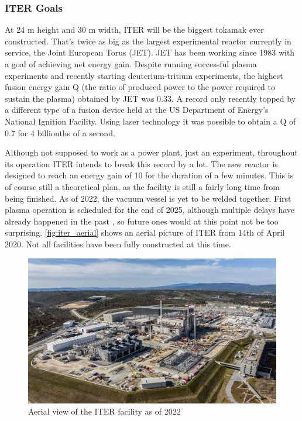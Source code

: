   \subsubsection{ITER Goals}

	At 24 m height and 30 m width, 
	ITER will be the biggest tokamak ever constructed. 
	That's twice as big as the largest experimental reactor currently in service, 
	the Joint European Torus (JET). JET has been working since 1983 with 
	a goal of achieving net energy gain. Despite running successful 
	plasma experiments and recently starting deuterium-tritium experiments,
	the highest fusion energy gain Q 
	(the ratio of produced power to the power required to sustain the plasma)
	obtained by JET was 0.33. A record only recently topped by a different 
	type of a fusion device held at the US Department of Energy’s
	National Ignition Facility. Using laser technology it was possible to
	obtain a Q of 0.7 for 4 billionths of a second. \cite{fusion_records}
	

	Although not supposed to work as a power plant, just an experiment,
	throughout its operation ITER intends to break this record by a lot.
	The new reactor is designed to reach an energy gain of 10 
	for the duration of a few minutes. This is of course still a theoretical
	plan, as the facility is still a fairly long time from being finished.
	As of 2022, the vacuum vessel is yet to be welded together\cite{iter_timeline}.
	First plasma operation is scheduled for the end of 2025\cite{iter_timeline},
	although multiple delays have already happened in the past \cite{iter_delays},
	so future ones would at this point not be too surprising. 
  \autoref{fig:iter_aerial} shows an aerial picture of ITER from 14th of April 2020.
  Not all facilities have been fully constructed at this time.
	\begin{figure}[H]
	  \centering
	  \includegraphics[width=.9\linewidth]{media/iter_aerial_2022.jpg}
	  \caption{Aerial view of the ITER facility as of 2022\cite{iter_website}}
	  \label{fig:iter_aerial}
	\end{figure}


